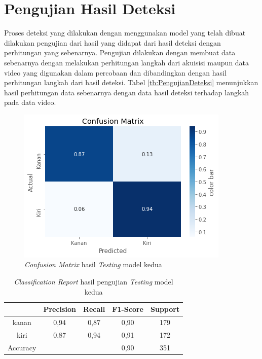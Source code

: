 \section{Pengujian Hasil Deteksi}
\label{sec:PengujianDeteksi}

Proses deteksi yang dilakukan dengan menggunakan model yang telah dibuat dilakukan pengujian dari hasil yang didapat dari hasil deteksi dengan perhitungan yang sebenarnya. Pengujian dilakukan dengan membuat data sebenarnya dengan melakukan perhitungan langkah dari akuisisi maupun data video yang digunakan dalam percobaan dan dibandingkan dengan hasil perhitungan langkah dari hasil deteksi. Tabel \ref{tb:PengujianDeteksi} menunjukkan hasil perhitungan data sebenarnya dengan data hasil deteksi terhadap langkah pada data video. 

\begin{figure}[H]
  \centering
  \includegraphics[scale=0.75]{gambar/cm model belakang.png}
  \caption{\emph{Confusion Matrix} hasil \emph{Testing} model kedua}
  \label{fig:HasilTestingModel2}
\end{figure}


\begin{longtable}{|c|c|c|c|c|}
  \caption{\emph{Classification Report} hasil pengujian \emph{Testing} model kedua}
  \label{tb:ClassificationReportModel2}                                   \\
  \hline
  \rowcolor[HTML]{C0C0C0}
   & \textbf{Precision} & \textbf{Recall} & \textbf{F1-Score} & \textbf{Support} \\
  \hline
  kanan     & 0,94    & 0,87    & 0,90    & 179         \\
  \hline
  kiri      & 0,87    & 0,94    & 0,91    & 172           \\
  \hline
  Accuracy  &         &         & 0,90    & 351            \\
  \hline
\end{longtable}


